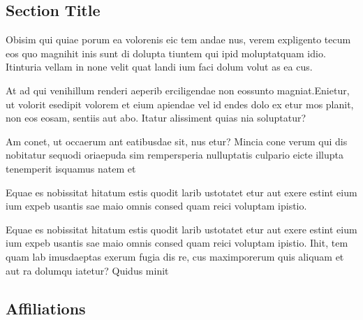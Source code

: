 \documentclass[
]{ImperialPoster}
\begin{document}
\begin{multicols}{3}
	\columnbreak %
	
	
	\section{Section Title}
	
	{
		\small %
		Obisim qui quiae porum ea volorenis eic tem andae nus, verem expligento tecum eos quo magnihit inis sunt di dolupta tiuntem qui ipid moluptatquam idio. Itinturia vellam in none velit quat landi ium faci dolum volut as ea cus.

		At ad qui venihillum renderi aeperib erciligendae non eossunto magniat.Enietur, ut volorit esedipit volorem et eium apiendae vel id endes dolo ex etur mos planit, non eos eosam, sentiis aut abo. Itatur alissiment quias nia soluptatur?

		Am conet, ut occaerum ant eatibusdae sit, nus etur? Mincia cone verum qui dis nobitatur sequodi oriaepuda sim rempersperia nulluptatis culpario eicte illupta tenemperit isquamus natem et\par
	}
	
	Equae es nobissitat hitatum estis quodit larib ustotatet \textcolor{ICLBlue}{etur aut exere estint eium ium expeb} usantis sae maio omnis consed quam reici voluptam ipistio.
	
	\vspace{0.31\textheight} %
	
	Equae es nobissitat hitatum estis quodit larib ustotatet etur aut exere estint eium ium expeb usantis sae maio omnis consed quam reici voluptam ipistio. Ihit, tem quam lab imusdaeptas exerum fugia dis re, cus maximporerum quis aliquam et aut ra dolumqu iatetur? Quidus minit
	
	\subsection{Affiliations}
	
	\\
	\\
	

\end{multicols}
\end{document}
